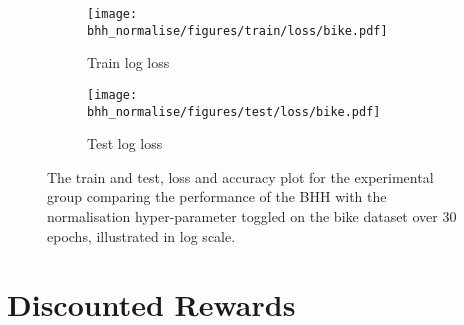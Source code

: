 \begin{figure}[htbp]
	\begin{subfigure}{0.5\textwidth}
		\centering
		\texttt{[image: bhh\_normalise/figures/train/loss/bike.pdf]}
		\caption{Train log loss}
		\label{fig:results:normalise:figures:loss:train:bike}
	\end{subfigure}
	\begin{subfigure}{0.5\textwidth}
		\centering
		\texttt{[image: bhh\_normalise/figures/test/loss/bike.pdf]}
		\caption{Test log loss}
		\label{fig:results:normalise:figures:loss:test:bike}
	\end{subfigure}
	\par\bigskip
	\caption{The train and test, loss and accuracy plot for the experimental group comparing the performance of the \acs{BHH} with the normalisation hyper-parameter toggled on the bike dataset over 30 epochs, illustrated in log scale.}
	\label{fig:results:normalise:figures:bike}
\end{figure}

\section{Discounted Rewards}\label{sec:results:discounted_rewards}

